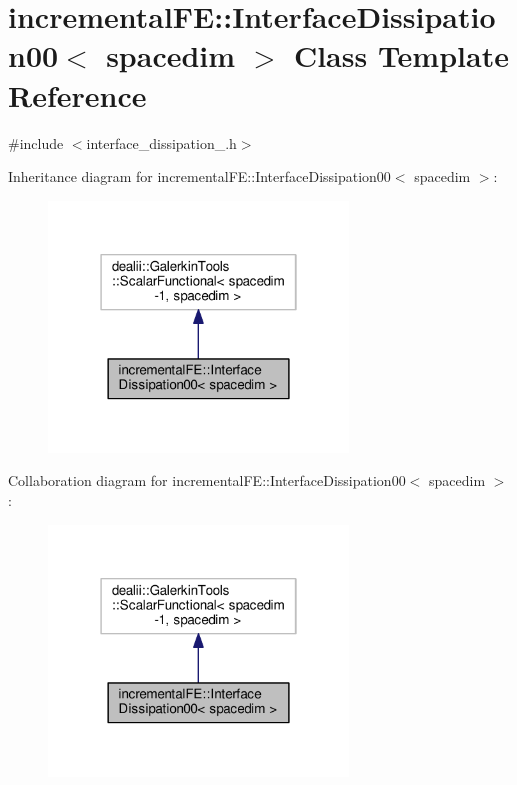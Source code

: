 \hypertarget{classincremental_f_e_1_1_interface_dissipation00}{}\section{incremental\+FE\+:\+:Interface\+Dissipation00$<$ spacedim $>$ Class Template Reference}
\label{classincremental_f_e_1_1_interface_dissipation00}


{\ttfamily \#include $<$interface\+\_\+dissipation\+\_.\+h$>$}



Inheritance diagram for incremental\+FE\+:\+:Interface\+Dissipation00$<$ spacedim $>$\+:\nopagebreak
\begin{figure}[H]
\begin{center}
\leavevmode
\includegraphics[width=226pt]{classincremental_f_e_1_1_interface_dissipation00__inherit__graph}
\end{center}
\end{figure}


Collaboration diagram for incremental\+FE\+:\+:Interface\+Dissipation00$<$ spacedim $>$\+:\nopagebreak
\begin{figure}[H]
\begin{center}
\leavevmode
\includegraphics[width=226pt]{classincremental_f_e_1_1_interface_dissipation00__coll__graph}
\end{center}
\end{figure}
